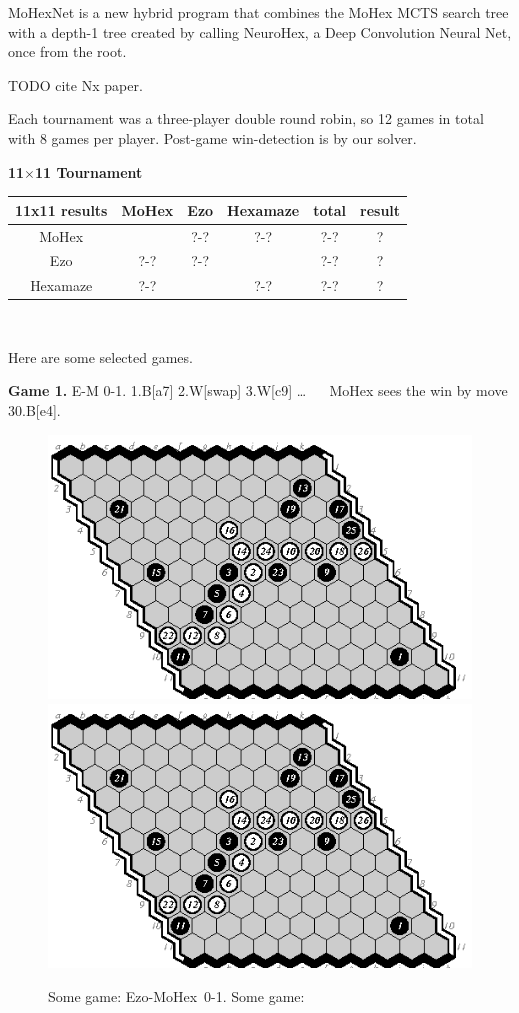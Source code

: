 \documentclass{icga}
\newif\iflong\longfalse  %
\def\Eo{\mbox{\sc Ezo}}
\def\Hz{\mbox{\sc Hexamaze}}
\def\Mx{\mbox{\sc MoHex}}
\def\Mt{\mbox{\sc MoHexNet}}
\def\Nx{\mbox{\sc NeuroHex}}
\begin{document}
\Mt{} is a new hybrid program that combines
the \Mx{} MCTS search tree with a 
depth-1 tree created by calling \Nx{}, 
a Deep Convolution Neural Net, once from the root.

TODO cite Nx paper.

Each tournament was a three-player double round robin, so 12 games
in total with 8 games per player.
Post-game win-detection is by our solver.

{\large\bf 11$\times$11 Tournament}

\hfill\begin{tabular}{|c|c|c|c|c|c|}
\hline 11x11 results &\Mx{} &\Eo{} & \Hz{}     & total & result \\ 
\hline \Mx{} &      &  ?-?    &  ?-?      & ?-?  &  ? \\
\hline \Eo{} &  ?-? &  ?-?    &           & ?-?  &  ? \\
\hline \Hz{} &  ?-? &         &  ?-?      & ?-?  &  ? \\
\hline
\end{tabular}\hfill~

Here are some selected games.
\iflong
This is the longer version, so we include all games.
\fi

{\bf Game 1.}
{\sc E-M 0-1.}
1.B[a7] 2.W[swap] 3.W[c9] \ldots ~ ~
\Mx{} sees the win by move 30.B[e4].

\begin{figure}[hbp]
\includegraphics[scale=1.3]{0556.eps}\hspace*{-1cm}\includegraphics[scale=1.3]{0556.eps}
\caption{Some game: \Eo-\Mx\ 0-1. Some game: }
\end{figure}
\end{document}
